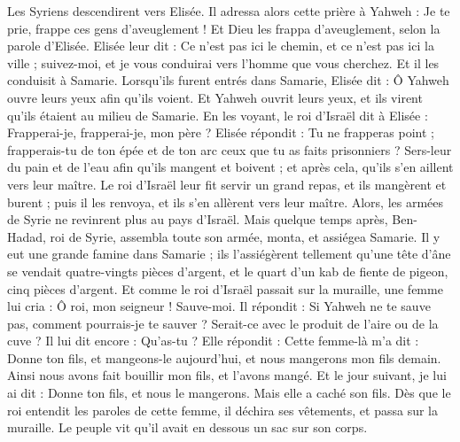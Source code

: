 \begin{multicols}{2}
Les Syriens descendirent vers Elisée. Il adressa alors cette prière à Yahweh : Je te prie, frappe ces gens d’aveuglement ! Et Dieu les frappa d’aveuglement, selon la parole d’Elisée.
Elisée leur dit : Ce n’est pas ici le chemin, et ce n’est pas ici la ville ; suivez-moi, et je vous conduirai vers l’homme que vous cherchez. Et il les conduisit à Samarie.
Lorsqu’ils furent entrés dans Samarie, Elisée dit : Ô Yahweh ouvre leurs yeux afin qu’ils voient. Et Yahweh ouvrit leurs yeux, et ils virent qu’ils étaient au milieu de Samarie.
En les voyant, le roi d’Israël dit à Elisée : Frapperai-je, frapperai-je, mon père ?
Elisée répondit : Tu ne frapperas point ; frapperais-tu de ton épée et de ton arc ceux que tu as faits prisonniers ? Sers-leur du pain et de l’eau afin qu’ils mangent et boivent ; et après cela, qu’ils s’en aillent vers leur maître.
Le roi d’Israël leur fit servir un grand repas, et ils mangèrent et burent ; puis il les renvoya, et ils s’en allèrent vers leur maître. Alors, les armées de Syrie ne revinrent plus au pays d’Israël.
Mais quelque temps après, Ben-Hadad, roi de Syrie, assembla toute son armée, monta, et assiégea Samarie.
Il y eut une grande famine dans Samarie ; ils l’assiégèrent tellement qu’une tête d’âne se vendait quatre-vingts pièces d’argent, et le quart d’un kab de fiente de pigeon, cinq pièces d’argent.
Et comme le roi d’Israël passait sur la muraille, une femme lui cria : Ô roi, mon seigneur ! Sauve-moi.
Il répondit : Si Yahweh ne te sauve pas, comment pourrais-je te sauver ? Serait-ce avec le produit de l’aire ou de la cuve ?
Il lui dit encore : Qu’as-tu ? Elle répondit : Cette femme-là m’a dit : Donne ton fils, et mangeons-le aujourd’hui, et nous mangerons mon fils demain.
Ainsi nous avons fait bouillir mon fils, et l’avons mangé. Et le jour suivant, je lui ai dit : Donne ton fils, et nous le mangerons. Mais elle a caché son fils.
Dès que le roi entendit les paroles de cette femme, il déchira ses vêtements, et passa sur la muraille. Le peuple vit qu’il avait en dessous un sac sur son corps.

\end{multicols}
